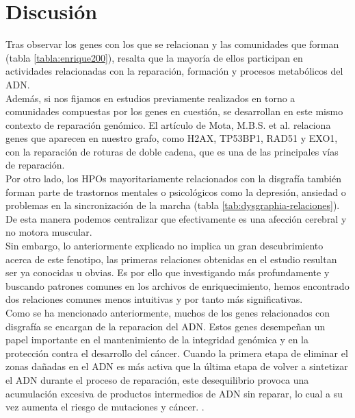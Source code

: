 \section{Discusión}

Tras observar los genes con los que se relacionan y las comunidades que forman (tabla \ref{tabla:enrique200}), resalta que la mayoría de ellos participan en actividades relacionadas con la reparación, formación y procesos metabólicos del ADN.\\

Además, si nos fijamos en estudios previamente realizados en torno a comunidades compuestas por los genes en cuestión, se desarrollan en este mismo contexto de reparación genómico. El artículo de Mota, M.B.S. et al. \cite{Mota2019} relaciona genes que aparecen en nuestro grafo, como H2AX, TP53BP1, RAD51 y EXO1, con la reparación de roturas de doble cadena, que es una de las principales vías de reparación.\\


Por otro lado, los HPOs mayoritariamente relacionados con la disgrafía también forman parte de trastornos mentales o psicológicos como la depresión, ansiedad o problemas en la sincronización de la marcha (tabla \ref{tab:dysgraphia-relaciones}). De esta manera podemos centralizar que efectivamente es una afección cerebral y no motora muscular.\\

Sin embargo, lo anteriormente explicado no implica un gran descubrimiento acerca de este fenotipo, las primeras relaciones obtenidas en el estudio resultan ser ya conocidas u obvias. Es por ello que investigando más profundamente y buscando patrones comunes en los archivos de enriquecimiento, hemos encontrado dos relaciones comunes menos intuitivas y por tanto más significativas.\\

Como se ha mencionado anteriormente, muchos de los genes relacionados con disgrafía se encargan de la reparacion del ADN. Estos genes desempeñan un papel importante en el mantenimiento de la integridad genómica y en la protección contra el desarrollo del cáncer. Cuando la primera etapa de eliminar el zonas dañadas en el ADN es más activa que la última etapa de volver a sintetizar el ADN durante el proceso de reparación, este desequilibrio provoca una acumulación excesiva de productos intermedios de ADN sin reparar, lo cual a su vez aumenta el riesgo de mutaciones y cáncer. \cite{Song2012}.\\


